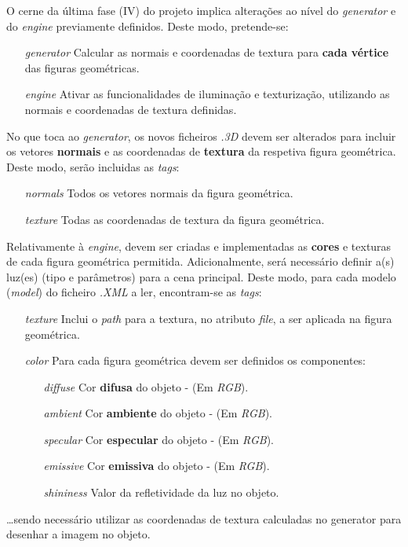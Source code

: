 \documentclass[runningheads]{llncs}
\begin{document}
    O cerne da última fase (IV) do projeto implica alterações ao nível do \textit{generator} e do \textit{engine} previamente definidos.
    Deste modo, pretende-se:
    \begin{itemize}
        \item [\textit{generator}]
            {Calcular as normais e coordenadas de textura para 
            \textbf{cada vértice} das figuras geométricas.}
        \item [\textit{engine}]
            {Ativar as funcionalidades de iluminação e 
            texturização, utilizando as normais e coordenadas
            de textura definidas.}
    \end{itemize}
    
    No que toca ao \textit{generator}, os novos ficheiros \textit{.3D} 
    devem ser alterados para incluir os vetores \textbf{normais} e 
    as coordenadas de \textbf{textura} da respetiva figura geométrica.
    Deste modo, serão incluidas as \textit{tags}:
    \begin{itemize}
        \item[\textit{normals}]{Todos os vetores normais da figura geométrica.}
        \item[\textit{texture}]{Todas as coordenadas de textura da figura geométrica.} 
    \end{itemize}

    Relativamente à \textit{engine}, devem ser criadas e implementadas
    as \textbf{cores} e texturas de cada figura geométrica permitida.
    Adicionalmente, será necessário definir a(s) luz(es) (tipo e parâmetros) 
    para a cena principal.
    Deste modo, para cada modelo (\textit{model}) do ficheiro \textit{.XML} a ler, 
    encontram-se as \textit{tags}:
    \begin{enumerate}
        \item[\textit{texture}]{Inclui o \textit{path} para a textura, no atributo \textit{file}, 
                                a ser aplicada na figura geométrica.}
        \item[\textit{color}]{Para cada figura geométrica devem ser definidos os componentes:}
        \begin{enumerate}
            \item[\textit{diffuse}]{Cor \textbf{difusa} do objeto - (Em \textit{RGB}).}
            \item[\textit{ambient}]{Cor \textbf{ambiente} do objeto - (Em \textit{RGB}).}
            \item[\textit{specular}]{Cor \textbf{especular} do objeto - (Em \textit{RGB}).}
            \item[\textit{emissive}]{Cor \textbf{emissiva} do objeto - (Em \textit{RGB}).}
            \item[\textit{shininess}]{Valor da refletividade da luz no objeto.}
        \end{enumerate}
    \end{enumerate}
    \dots sendo necessário utilizar as coordenadas de textura 
    calculadas no generator para desenhar a imagem no objeto.
\end{document}
